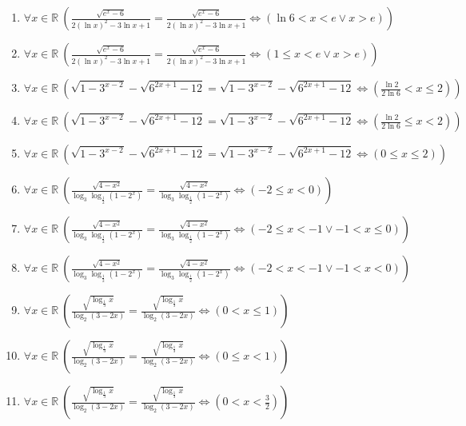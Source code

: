 \documentclass[11pt,a4paper]{article}
\begin{document}
\begin{enumerate}
\item $\displaystyle \forall x \in \mathbb{R}\ \left( \frac{\sqrt{e^{x} - 6}}{2\left(\ln x\right)^{2} - 3\ln x + 1} = \frac{\sqrt{e^{x} - 6}}{2\left(\ln x\right)^{2} - 3\ln x + 1} \iff \left( \ln 6 < x < e \lor x > e \right) \right)$
\item $\displaystyle \forall x \in \mathbb{R}\ \left( \frac{\sqrt{e^{x} - 6}}{2\left(\ln x\right)^{2} - 3\ln x + 1} = \frac{\sqrt{e^{x} - 6}}{2\left(\ln x\right)^{2} - 3\ln x + 1} \iff \left( 1 \le x < e \lor x > e \right) \right)$
\item $\displaystyle \forall x \in \mathbb{R}\ \left( \sqrt{1 - 3^{x-2}} - \sqrt{6^{2x+1} - 12} = \sqrt{1 - 3^{x-2}} - \sqrt{6^{2x+1} - 12} \iff \left( \frac{\ln 2}{2\ln 6} < x \le 2 \right) \right)$
\item $\displaystyle \forall x \in \mathbb{R}\ \left( \sqrt{1 - 3^{x-2}} - \sqrt{6^{2x+1} - 12} = \sqrt{1 - 3^{x-2}} - \sqrt{6^{2x+1} - 12} \iff \left( \frac{\ln 2}{2\ln 6} \le x < 2 \right) \right)$
\item $\displaystyle \forall x \in \mathbb{R}\ \left( \sqrt{1 - 3^{x-2}} - \sqrt{6^{2x+1} - 12} = \sqrt{1 - 3^{x-2}} - \sqrt{6^{2x+1} - 12} \iff \left( 0 \le x \le 2 \right) \right)$
\item $\displaystyle \forall x \in \mathbb{R}\ \left( \frac{\sqrt{4 - x^{2}}}{\log_{3}\log_{\frac{1}{2}}(1 - 2^{x})} = \frac{\sqrt{4 - x^{2}}}{\log_{3}\log_{\frac{1}{2}}(1 - 2^{x})} \iff \left( -2 \le x < 0 \right) \right)$
\item $\displaystyle \forall x \in \mathbb{R}\ \left( \frac{\sqrt{4 - x^{2}}}{\log_{3}\log_{\frac{1}{2}}(1 - 2^{x})} = \frac{\sqrt{4 - x^{2}}}{\log_{3}\log_{\frac{1}{2}}(1 - 2^{x})} \iff \left( -2 \le x < -1 \lor -1 < x \le 0 \right) \right)$
\item $\displaystyle \forall x \in \mathbb{R}\ \left( \frac{\sqrt{4 - x^{2}}}{\log_{3}\log_{\frac{1}{2}}(1 - 2^{x})} = \frac{\sqrt{4 - x^{2}}}{\log_{3}\log_{\frac{1}{2}}(1 - 2^{x})} \iff \left( -2 < x < -1 \lor -1 < x < 0 \right) \right)$
\item $\displaystyle \forall x \in \mathbb{R}\ \left( \frac{\sqrt{\log_{\frac{1}{3}} x}}{\log_{2}(3 - 2x)} = \frac{\sqrt{\log_{\frac{1}{3}} x}}{\log_{2}(3 - 2x)} \iff \left( 0 < x \le 1 \right) \right)$
\item $\displaystyle \forall x \in \mathbb{R}\ \left( \frac{\sqrt{\log_{\frac{1}{3}} x}}{\log_{2}(3 - 2x)} = \frac{\sqrt{\log_{\frac{1}{3}} x}}{\log_{2}(3 - 2x)} \iff \left( 0 \le x < 1 \right) \right)$
\item $\displaystyle \forall x \in \mathbb{R}\ \left( \frac{\sqrt{\log_{\frac{1}{3}} x}}{\log_{2}(3 - 2x)} = \frac{\sqrt{\log_{\frac{1}{3}} x}}{\log_{2}(3 - 2x)} \iff \left( 0 < x < \frac{3}{2} \right) \right)$

\end{enumerate}
\end{document}
